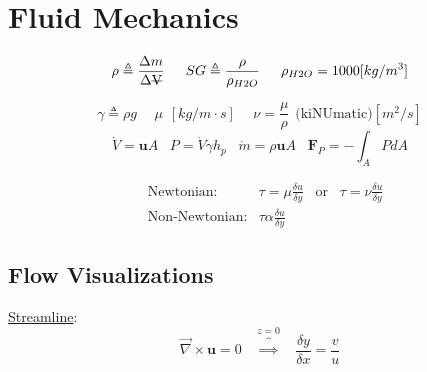 \documentclass[twocolumn, 12pt]{article}
\begin{document}
\small{

\section*{Fluid Mechanics}

\begin{equation*}
    \rho \triangleq \frac{\Delta m}{\Delta \text{\sout{V}}} \hspace{15pt}   SG \triangleq \frac{\rho}{\rho_{H2O}} \hspace{15pt}  \rho_{H2O} = 1000 [kg/m^3]
\end{equation*}

\begin{equation*}
    \gamma \triangleq \rho g    \hspace{15pt}  \mu \hspace{5pt}[kg/m\cdot s] \hspace{15pt}  \nu = \frac{\mu}{\rho}\hspace{5pt}  \text{(kiNUmatic)}[m^2/s]  
\end{equation*}
\begin{equation*}
    \dot{V}=\textbf{u}A \hspace{10pt} P = \dot{V}\gamma h_p \hspace{10pt} \dot{m}=\rho \textbf{u} A \hspace{10pt} \textbf{F}_P = -\int_A PdA
\end{equation*} 

\begin{align*}
    &\text{Newtonian:} & \tau = \mu \frac{\delta u}{\delta y} \hspace{10pt}   \text{or}   \hspace{10pt} \tau = \nu \frac{\delta u}{\delta y}\\
    &\text{Non-Newtonian:} & \tau \alpha \frac{\delta u }{\delta y}
\end{align*}


\subsection*{Flow Visualizations}

\underline{Streamline}:
\begin{equation*}
    \vec{\nabla} \times \textbf{u}=0 \hspace{10pt} \overbrace{\implies}^{z=0} \hspace{10pt}\frac{\delta y}{\delta x} = \frac{v}{u}
\end{equation*}

}
\end{document}
